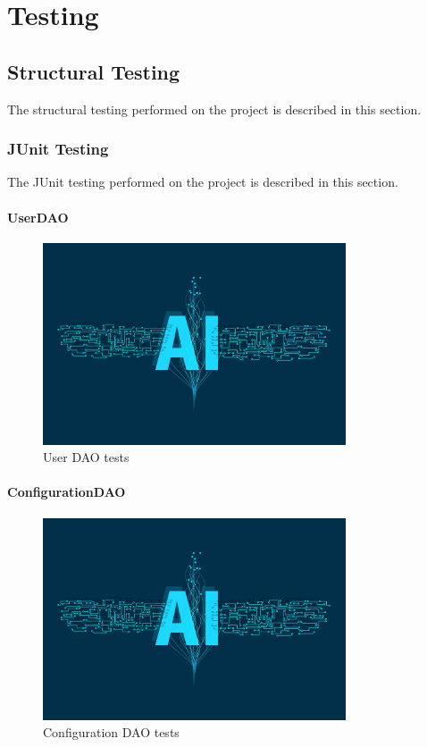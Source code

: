 \chapter{Testing}

\section{Structural Testing}

The structural testing performed on the project is described in this section.

\subsection{JUnit Testing}

The JUnit testing performed on the project is described in this section.

\subsubsection{UserDAO}
\begin{figure}[ht!]
    \centering
    \includegraphics[width=0.8\textwidth]{images/placeholder.jpg}
    \caption{User DAO tests}
    \label{fig:u_dao_test}
\end{figure}

\newpage
\subsubsection{ConfigurationDAO}
\begin{figure}[ht!]
    \centering
    \includegraphics[width=0.8\textwidth]{images/placeholder.jpg}
    \caption{Configuration DAO tests}
    \label{fig:c_dao_test}
\end{figure}

